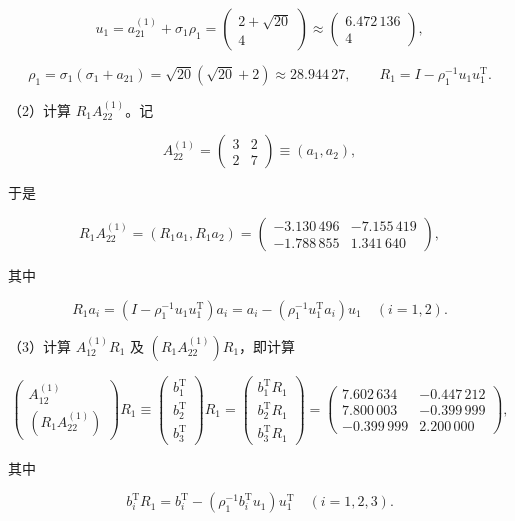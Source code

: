 \documentclass[
  10pt,
  fontset=fandol]{ctexart}
\begin{document}
\[
u_1=a_{21}^{(1)}+\sigma_1\rho_1=\begin{pmatrix}2+\sqrt{20}\\4\end{pmatrix}
\approx\begin{pmatrix}6.472\,136\\4\end{pmatrix},
\]

\[
\rho_1=\sigma_1(\sigma_1+a_{21})=\sqrt{20}(\sqrt{20}+2)\approx28.944\,27,\qquad
R_1=I-\rho_1^{-1}u_1u_1^{\mathrm T}.
\]

（2）计算 \(R_1A_{22}^{(1)}\)。记

\[
A_{22}^{(1)}=\begin{pmatrix}3&2\\2&7\end{pmatrix}\equiv(a_1,a_2),
\]

于是

\[
R_1A_{22}^{(1)}=(R_1a_1,R_1a_2)
=\begin{pmatrix}-3.130\,496&-7.155\,419\\-1.788\,855&1.341\,640\end{pmatrix},
\]

其中

\[
R_1a_i=(I-\rho_1^{-1}u_1u_1^{\mathrm T})a_i
=a_i-(\rho_1^{-1}u_1^{\mathrm T}a_i)u_1\quad(i=1,2).
\]

（3）计算 \(A_{12}^{(1)}R_1\) 及 \((R_1A_{22}^{(1)})R_1\)，即计算

\[
\begin{pmatrix}A_{12}^{(1)}\\(R_1A_{22}^{(1)})\end{pmatrix}R_1
\equiv\begin{pmatrix}b_1^{\mathrm T}\\b_2^{\mathrm T}\\b_3^{\mathrm T}\end{pmatrix}R_1
=\begin{pmatrix}b_1^{\mathrm T}R_1\\b_2^{\mathrm T}R_1\\b_3^{\mathrm T}R_1\end{pmatrix}
=\begin{pmatrix}
7.602\,634&-0.447\,212\\
7.800\,003&-0.399\,999\\
-0.399\,999&2.200\,000
\end{pmatrix},
\]

其中

\[
b_i^{\mathrm T}R_1=b_i^{\mathrm T}-(\rho_1^{-1}b_i^{\mathrm T}u_1)u_1^{\mathrm T}
\quad(i=1,2,3).
\]
\end{document}
